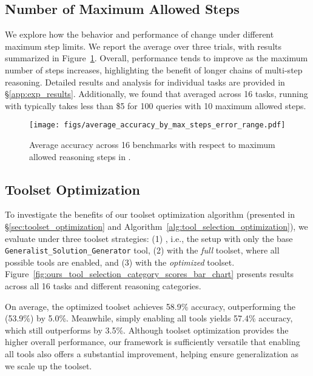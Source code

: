 \subsection{Number of Maximum Allowed Steps}

We explore how the behavior and performance of \model change under different maximum step limits. We report the average over three trials, with results summarized in Figure~\ref{fig:average_accuracy_by_max_steps}.
Overall, performance tends to improve as the maximum number of steps increases, highlighting the benefit of longer chains of multi-step reasoning. Detailed results and analysis for individual tasks are provided in \S\ref{app:exp_results}. Additionally, we found that averaged across 16 tasks, running \model with \gpt typically takes less than \$5 for 100 queries with 10 maximum allowed steps.

\begin{figure}[th!]
    \centering
    \texttt{[image: figs/average\_accuracy\_by\_max\_steps\_error\_range.pdf]}
    \vspace{-2mm}
    \caption{Average accuracy across 16 benchmarks with respect to maximum allowed reasoning steps in \model.}
\label{fig:average_accuracy_by_max_steps}
\end{figure}


\subsection{Toolset Optimization}
\label{sec:ablation_toolset}

To investigate the benefits of our toolset optimization algorithm (presented in \S\ref{sec:toolset_optimization} and Algorithm~\ref{alg:tool_selection_optimization}), we evaluate \model under three toolset strategies: (1) \modelbase, i.e., the setup with only the base \texttt{Generalist\_Solution\_Generator} tool, (2) \model with the \textit{full} toolset, where all possible tools are enabled, and (3) \model with the \textit{optimized} toolset. Figure~\ref{fig:ours_tool_selection_category_scores_bar_chart} presents results across all 16 tasks and different reasoning categories.

On average, the optimized toolset achieves 58.9\% accuracy, outperforming the \modelbase (53.9\%) by 5.0\%. Meanwhile, simply enabling all tools yields 57.4\% accuracy, which still outperforms \modelbase by 3.5\%. Although toolset optimization provides the higher overall performance, our framework is sufficiently versatile that enabling all tools also offers a substantial improvement, helping ensure generalization as we scale up the toolset.

